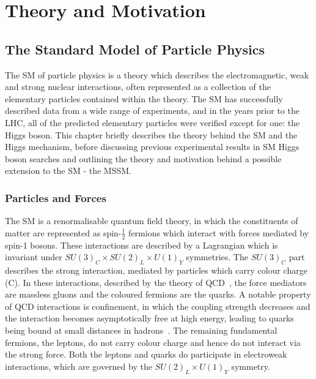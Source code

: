 \chapter{Theory and Motivation}
\label{chap:theory}

\section{The Standard Model of Particle Physics}
\label{sec:theSM}

The \ac{SM} of particle physics is a theory
which describes the electromagnetic, weak and strong nuclear interactions, often
represented as a collection of the elementary particles contained within the theory.
The \ac{SM} has successfully described data from a wide range of experiments, and in the 
years prior to the LHC, all of the predicted elementary particles were verified 
except for one: the Higgs boson. This chapter briefly describes the theory
behind the \ac{SM} and the Higgs mechanism, before discussing previous
experimental results in \ac{SM} Higgs boson searches and outlining the theory
and motivation behind a possible extension to the \ac{SM} - the \ac{MSSM}.

\subsection{Particles and Forces} 
\label{sec:particlesandforces}

The \ac{SM} is a renormalisable quantum field theory, in which the constituents of
matter are represented as spin-$\frac{1}{2}$ fermions which interact with
forces mediated by spin-1 bosons. These interactions are described by a
Lagrangian which is invariant under $SU(3)_{C} \times SU(2)_{L} \times U(1)_{Y}$
symmetries. The $SU(3)_{C}$ part describes the strong interaction, mediated by
particles which carry colour charge (C). In these interactions, described by the
theory of \ac{QCD}~\cite{Griffiths:2008nx,Perkins:2000uq}, the force mediators are massless gluons
and the coloured fermions are the quarks. A notable property of \ac{QCD} interactions
is confinement, in which the coupling strength decreases and the interaction
becomes asymptotically free at high energy, leading to quarks being bound at 
small distances in hadrons~\cite{Gross:1973id,Politzer:1973fx}. The remaining fundamental fermions,
the leptons, do not carry colour charge and hence do not interact via the strong
force. Both the leptons and quarks do participate in electroweak interactions,
which are governed by the $SU(2)_{L} \times U(1)_{Y}$ symmetry.

